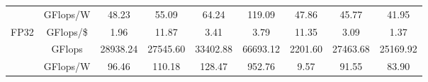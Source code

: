 \begin{table}[H]
\begin{adjustwidth}{-1.5in}{-1.5in}
\begin{center}
{\begin{tabular}{cc||c|c|c|c|c|c|c}
                                  & GFlops/W                                                                               & 48.23                                                           & 55.09                                                            & 64.24                                                                & 119.09                                                        & 47.86                                                                & 45.77                                                                  & 41.95                                                                  \\
\multirow{-3}{*}{FP32}            & \cellcolor[HTML]{EFEFEF}GFlops/\$                                                      & \cellcolor[HTML]{EFEFEF}1.96                                    & \cellcolor[HTML]{EFEFEF}11.87                                    & \cellcolor[HTML]{EFEFEF}3.41                                         & \cellcolor[HTML]{EFEFEF}3.79                                  & \cellcolor[HTML]{EFEFEF}11.35                                        & \cellcolor[HTML]{EFEFEF}3.09                                           & \cellcolor[HTML]{EFEFEF}1.37                                           \\ \hline
                                  & GFlops                                                                                 & 28938.24                                                        & 27545.60                                                         & 33402.88                                                             & 66693.12                                                      & 2201.60                                                              & 27463.68                                                               & 25169.92                                                               \\
                                  & \cellcolor[HTML]{EFEFEF}GFlops/W                                                       & \cellcolor[HTML]{EFEFEF}96.46                                   & \cellcolor[HTML]{EFEFEF}110.18                                   & \cellcolor[HTML]{EFEFEF}128.47                                       & \cellcolor[HTML]{EFEFEF}952.76                                & \cellcolor[HTML]{EFEFEF}9.57                                         & \cellcolor[HTML]{EFEFEF}91.55                                          & \cellcolor[HTML]{EFEFEF}83.90                                          \\

\end{tabular}}
\end{center}
\end{adjustwidth}
\end{table}
